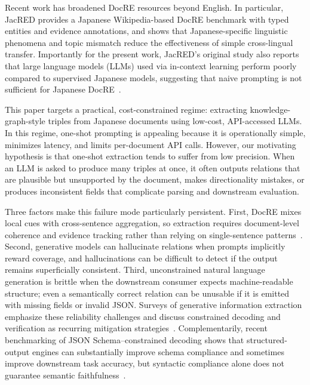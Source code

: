 \documentclass{article} %
\begin{document}
Recent work has broadened DocRE resources beyond English. In particular, JacRED provides a Japanese Wikipedia-based DocRE benchmark with typed entities and evidence annotations, and shows that Japanese-specific linguistic phenomena and topic mismatch reduce the effectiveness of simple cross-lingual transfer. Importantly for the present work, JacRED’s original study also reports that large language models (LLMs) used via in-context learning perform poorly compared to supervised Japanese models, suggesting that naive prompting is not sufficient for Japanese DocRE~\cite{ma-2024-building}.

This paper targets a practical, cost-constrained regime: extracting knowledge-graph-style triples from Japanese documents using low-cost, API-accessed LLMs. In this regime, one-shot prompting is appealing because it is operationally simple, minimizes latency, and limits per-document API calls. However, our motivating hypothesis is that one-shot extraction tends to suffer from low precision. When an LLM is asked to produce many triples at once, it often outputs relations that are plausible but unsupported by the document, makes directionality mistakes, or produces inconsistent fields that complicate parsing and downstream evaluation.

Three factors make this failure mode particularly persistent. First, DocRE mixes local cues with cross-sentence aggregation, so extraction requires document-level coherence and evidence tracking rather than relying on single-sentence patterns~\cite{delaunay-2023-comprehensive}. Second, generative models can hallucinate relations when prompts implicitly reward coverage, and hallucinations can be difficult to detect if the output remains superficially consistent. Third, unconstrained natural language generation is brittle when the downstream consumer expects machine-readable structure; even a semantically correct relation can be unusable if it is emitted with missing fields or invalid JSON\@. Surveys of generative information extraction emphasize these reliability challenges and discuss constrained decoding and verification as recurring mitigation strategies~\cite{xu-2023-large}. Complementarily, recent benchmarking of JSON Schema–constrained decoding shows that structured-output engines can substantially improve schema compliance and sometimes improve downstream task accuracy, but syntactic compliance alone does not guarantee semantic faithfulness~\cite{geng-2025-generating}.
\end{document}
